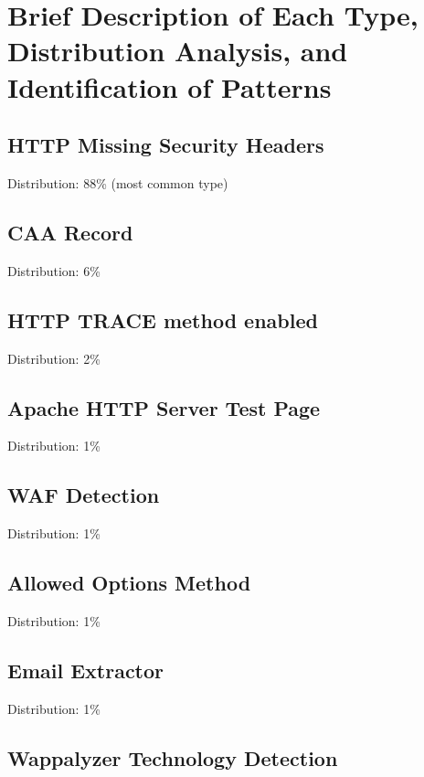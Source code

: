 \section{Brief Description of Each Type, Distribution Analysis, and Identification of Patterns}

\subsection{HTTP Missing Security Headers}

Distribution: 88\% (most common type)

\subsection{CAA Record}

Distribution: 6\%

\subsection{HTTP TRACE method enabled}

Distribution: 2\%

\subsection{Apache HTTP Server Test Page}

Distribution: 1\%

\subsection{WAF Detection}

Distribution: 1\%

\subsection{Allowed Options Method}

Distribution: 1\%

\subsection{Email Extractor}

Distribution: 1\%

\subsection{Wappalyzer Technology Detection}

